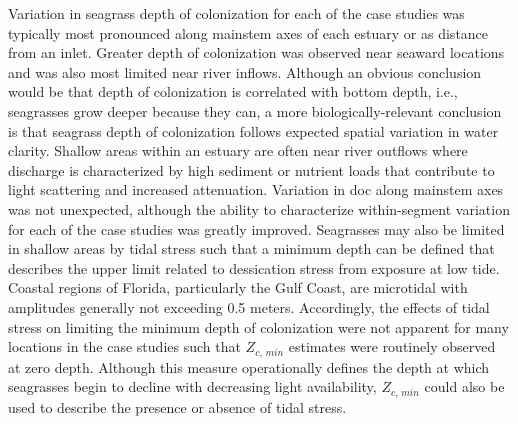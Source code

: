 \documentclass[letterpaper,12pt,oneside]{article}\usepackage[]{graphicx}\usepackage[]{color}
\begin{document}
Variation in seagrass depth of colonization for each of the case studies was typically most pronounced along mainstem axes of each estuary or as distance from an inlet.  Greater depth of colonization was observed near seaward locations and was also most limited near river inflows.  Although an obvious conclusion would be that depth of colonization is correlated with bottom depth, i.e., seagrasses grow deeper because they can, a more biologically-relevant conclusion is that seagrass depth of colonization follows expected spatial variation in water clarity.  Shallow areas within an estuary are often near river outflows where discharge is characterized by high sediment or nutrient loads that contribute to light scattering and increased attenuation.  Variation in \ac{doc} along mainstem axes was not unexpected, although the ability to characterize within-segment variation for each of the case studies was greatly improved.  Seagrasses may also be limited in shallow areas by tidal stress such that a minimum depth can be defined that describes the upper limit related to dessication stress from exposure at low tide.  Coastal regions of Florida, particularly the Gulf Coast, are microtidal with amplitudes generally not exceeding 0.5 meters.  Accordingly, the effects of tidal stress on limiting the minimum depth of colonization were not apparent for many locations in the case studies such that $Z_{c,\,min}$ estimates were routinely observed at zero depth.  Although this measure operationally defines the depth at which seagrasses begin to decline with decreasing light availability, $Z_{c,\,min}$ could also be used to describe the presence or absence of tidal stress.
\end{document}
